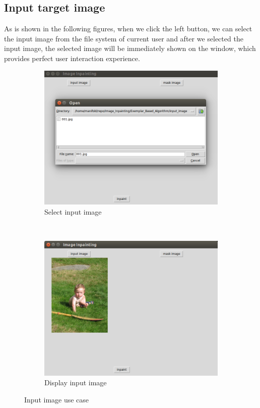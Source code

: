 \subsection{Input target image}
As is shown in the following figures, when we click the left button, we can select the input image from the file system of current user and after we selected the input image, the selected image will be immediately shown on the window, which provides perfect user interaction experience.

\begin{figure}[H]
\centering
\begin{subfigure}{0.45\textwidth}
\includegraphics[width=\textwidth]{ex_input.png}
\caption{Select input image}
\end{subfigure}
~
\begin{subfigure}{0.45\textwidth}
\includegraphics[width=\textwidth]{ex_input_img.png}
\caption{Display input image}
\end{subfigure}
\caption{Input image use case}
\end{figure}

